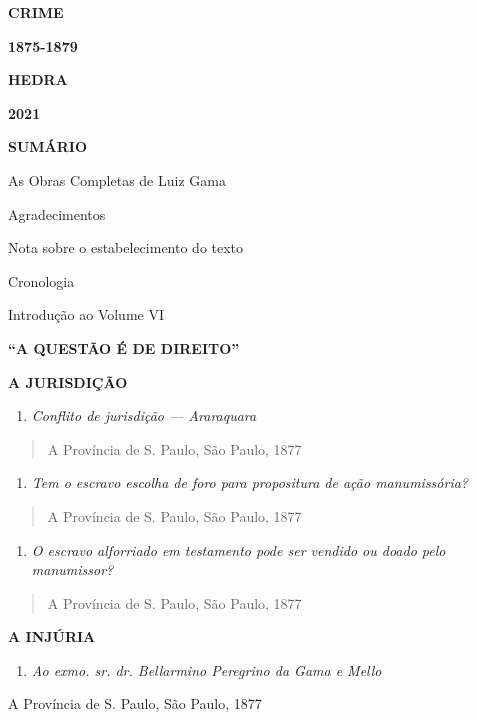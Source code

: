 
\textbf{CRIME}

\textbf{1875-1879}

\textbf{HEDRA}

\textbf{2021}

\textbf{SUMÁRIO}

As Obras Completas de Luiz Gama

Agradecimentos

Nota sobre o estabelecimento do texto

Cronologia

Introdução ao Volume VI

\textbf{``A QUESTÃO É DE DIREITO''}

\textbf{A JURISDIÇÃO}

\begin{enumerate}
\def\labelenumi{\arabic{enumi}.}
\item
  \emph{Conflito de jurisdição --- Araraquara}
\end{enumerate}

\begin{quote}
A Província de S. Paulo, São Paulo, 1877
\end{quote}

\begin{enumerate}
\def\labelenumi{\arabic{enumi}.}
\item
  \emph{Tem o escravo escolha de foro para propositura de ação
  manumissória?}
\end{enumerate}

\begin{quote}
A Província de S. Paulo, São Paulo, 1877
\end{quote}

\begin{enumerate}
\def\labelenumi{\arabic{enumi}.}
\item
  \emph{O escravo alforriado em testamento pode ser vendido ou doado
  pelo manumissor?}
\end{enumerate}

\begin{quote}
A Província de S. Paulo, São Paulo, 1877
\end{quote}

\textbf{A INJÚRIA}

\begin{enumerate}
\def\labelenumi{\arabic{enumi}.}
\item
  \emph{Ao exmo. sr. dr. Bellarmino Peregrino da Gama e Mello}
\end{enumerate}

A Província de S. Paulo, São Paulo, 1877

